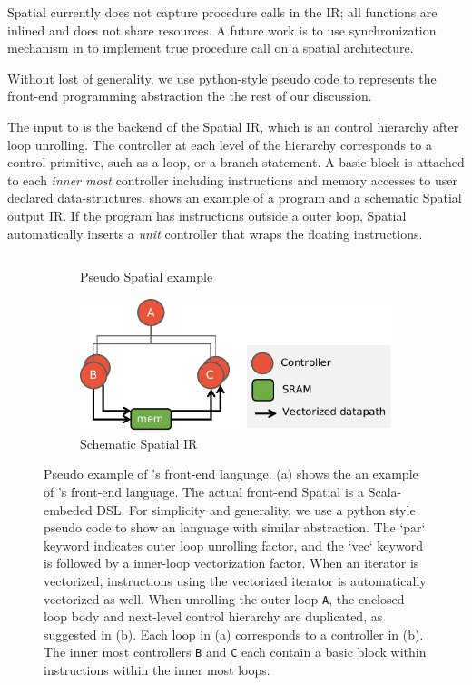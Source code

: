 Spatial currently does not capture procedure calls in the IR; all functions are inlined and does not
share resources. A future work is to use synchronization mechanism in \name to implement true procedure
call on a spatial architecture.

Without lost of generality, we use python-style pseudo code to represents the front-end programming
abstraction the the rest of our discussion.

The input to \name is the backend of the Spatial IR, which is an control hierarchy after loop
unrolling.
The controller at each level of the hierarchy corresponds to a control primitive, such as a loop, or
a branch statement. A basic block is attached to each \emph{inner most} controller including instructions
and memory accesses to user declared data-structures.
 shows an example of a program and a schematic Spatial output IR.
If the program has instructions outside a outer loop, Spatial automatically inserts a \emph{unit}
controller that wraps the floating instructions.

\begin{figure}
\centering
\begin{subfigure}[b]{0.4\textwidth}
\inputminted{python}{code/spatialegpar.py}
\caption{Pseudo Spatial example}
\end{subfigure}
\hfill
\begin{subfigure}[b]{0.58\textwidth}
\includegraphics[width=1\textwidth]{figs/spatialir.pdf}
\caption{Schematic Spatial IR}
\end{subfigure}
\caption[Spatial Example]{
  Pseudo example of \name's front-end language.
  (a) shows the an example of \name's front-end language. The actual front-end Spatial is a
  Scala-embeded DSL. For simplicity and generality, we use a python style pseudo code to show an
  language with similar abstraction. The `par` keyword indicates outer loop unrolling factor, and
  the `vec` keyword is followed by a inner-loop vectorization factor.
  When an iterator is vectorized, instructions using the vectorized iterator is automatically
  vectorized as well. When unrolling the outer loop \texttt{A}, the enclosed loop body and
  next-level control hierarchy are duplicated, as suggested in (b).
  Each loop in (a) corresponds to a controller in (b). The inner most controllers \texttt{B} and
  \texttt{C} each contain a basic block within instructions within the inner most loops.
}
\label{fig:spatialegpar}
\end{figure}

